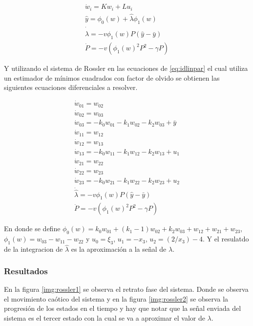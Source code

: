 \begin{equation}\label{eq:idlinpar}
	\begin{array}{c}
		\dot{w}_i = Kw_i + Lu_i\\
		\hat{y} = \phi_0(w) + \hat{\lambda}\phi_1(w)\\
		\dot{\hat{\lambda}} = -v\phi_1(w)P(\hat{y} - \bar{y})\\
		\dot{P} = -v( \phi_1(w)^2P^2 - \gamma P )
	\end{array}
\end{equation}

Y utilizando el sistema de Rossler en las ecuaciones de \ref{eq:idlinpar} el cual utiliza un estimador de mínimos cuadrados con factor de olvido se obtienen las siguientes ecuaciones diferenciales a resolver.

\begin{equation}
	\begin{array}{l}
		\dot{w}_{01} = w_{02}\\
		\dot{w}_{02} = w_{03}\\
		\dot{w}_{03} = -k_0w_{01} - k_1w_{02} - k_2w_{03} + \bar{y}\\
		\dot{w}_{11} = w_{12}\\
		\dot{w}_{12} = w_{13}\\
		\dot{w}_{13} = -k_0w_{11} - k_1w_{12} - k_2w_{13} + u_1\\
		\dot{w}_{21} = w_{22}\\
		\dot{w}_{22} = w_{23}\\
		\dot{w}_{23} = -k_0w_{21} - k_1w_{22} - k_2w_{23} + u_2\\
		\dot{\hat{\lambda}} = -v\phi_1(w)P(\hat{y} - \bar{y})\\
		\dot{P} = -v( \phi_1(w)^2P^2 - \gamma P )
	\end{array}
\end{equation}

En donde se define $\phi_0(w) = k_0w_{01} + (k_1 - 1)w_{02} + k_2w_{03} + w_{12} + w_{21} + w_{23}$, $\phi_1(w) = w_{03} - w_{11} - w_{22}$ y $u_0 = \xi_3$, $u_1 = -x_3$, $u_2 = (2/x_3) - 4$. Y el resulatdo de la integracion de $\hat{\lambda}$ es la aproximación a la señal de $\lambda$.\\

\subsubsection*{Resultados}

En la figura \ref{img:rossler1} se observa el retrato fase del sistema. Donde se observa el movimiento caótico del sistema y en la figura \ref{img:rossler2} se observa la progresión de los estados en el tiempo y hay que notar que la señal enviada del sistema es el tercer estado con la cual se va a aproximar el valor de $\lambda$. 


